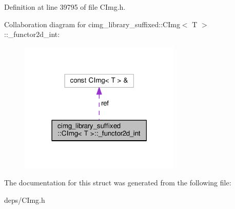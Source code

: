 Definition at line 39795 of file C\+Img.\+h.



Collaboration diagram for cimg\+\_\+library\+\_\+suffixed\+:\+:C\+Img$<$ T $>$\+:\+:\+\_\+functor2d\+\_\+int\+:
\nopagebreak
\begin{figure}[H]
\begin{center}
\leavevmode
\includegraphics[width=218pt]{dd/db5/structcimg__library__suffixed_1_1CImg_1_1__functor2d__int__coll__graph}
\end{center}
\end{figure}


The documentation for this struct was generated from the following file\+:\begin{DoxyCompactItemize}
\item 
deps/C\+Img.\+h\end{DoxyCompactItemize}
